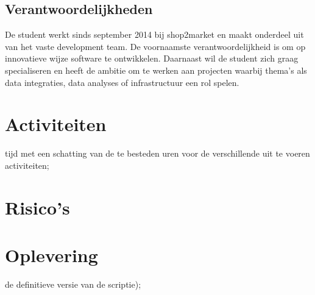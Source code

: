 \subsection{Verantwoordelijkheden}

De student werkt sinds september 2014 bij shop2market en maakt onderdeel uit van het vaste development team. De voornaamste verantwoordelijkheid is om op innovatieve wijze software te ontwikkelen. Daarnaast wil de student zich graag specialiseren en heeft de ambitie om te werken aan projecten waarbij thema’s als data integraties, data analyses of infrastructuur een rol spelen.


\section{Activiteiten} %
tijd met een schatting van de te besteden uren voor de verschillende uit te voeren activiteiten;

\section{Risico's} %

\section{Oplevering}

de definitieve versie van de scriptie);
